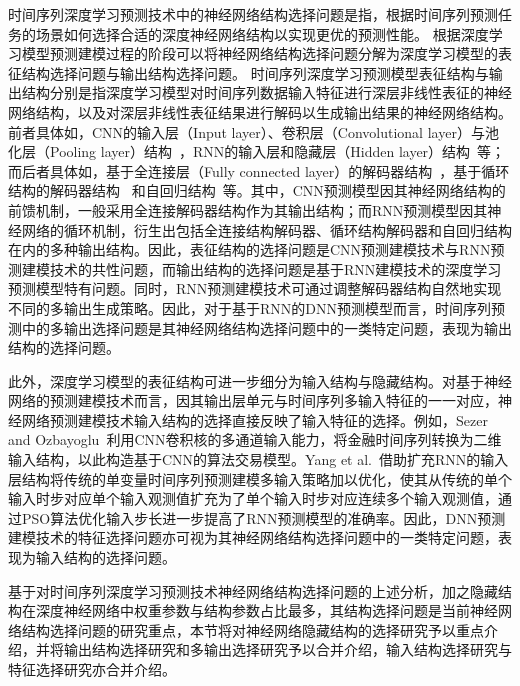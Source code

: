 时间序列深度学习预测技术中的神经网络结构选择问题是指，根据时间序列预测任务的场景如何选择合适的深度神经网络结构以实现更优的预测性能。
根据深度学习模型预测建模过程的阶段可以将神经网络结构选择问题分解为深度学习模型的表征结构选择问题与输出结构选择问题。
时间序列深度学习预测模型表征结构与输出结构分别是指深度学习模型对时间序列数据输入特征进行深层非线性表征的神经网络结构，以及对深层非线性表征结果进行解码以生成输出结果的神经网络结构。
前者具体如，CNN的输入层（Input layer）、卷积层（Convolutional layer）与池化层（Pooling layer）结构~\cite{koprinskaConvolutional2018}，RNN的输入层和隐藏层（Hidden layer）结构~\cite{salinasDeepAR2020}等；而后者具体如，基于全连接层（Fully connected layer）的解码器结构~\cite{koprinskaConvolutional2018,caiDayahead2019}，基于循环结构的解码器结构~\cite{liuDSTPRNN2020}
和自回归结构~\cite{caiDayahead2019,salinasDeepAR2020}等。其中，CNN预测模型因其神经网络结构的前馈机制，一般采用全连接解码器结构作为其输出结构；而RNN预测模型因其神经网络的循环机制，衍生出包括全连接结构解码器、循环结构解码器和自回归结构在内的多种输出结构。因此，表征结构的选择问题是CNN预测建模技术与RNN预测建模技术的共性问题，而输出结构的选择问题是基于RNN建模技术的深度学习预测模型特有问题。同时，RNN预测建模技术可通过调整解码器结构自然地实现不同的多输出生成策略。因此，对于基于RNN的DNN预测模型而言，时间序列预测中的多输出选择问题是其神经网络结构选择问题中的一类特定问题，表现为输出结构的选择问题。

此外，深度学习模型的表征结构可进一步细分为输入结构与隐藏结构。对基于神经网络的预测建模技术而言，因其输出层单元与时间序列多输入特征的一一对应，神经网络预测建模技术输入结构的选择直接反映了输入特征的选择。例如，Sezer and Ozbayoglu~\cite{sezer2018algorithmic}利用CNN卷积核的多通道输入能力，将金融时间序列转换为二维输入结构，以此构造基于CNN的算法交易模型。Yang et al.~\cite{yangShortterm2021}借助扩充RNN的输入层结构将传统的单变量时间序列预测建模多输入策略加以优化，使其从传统的单个输入时步对应单个输入观测值扩充为了单个输入时步对应连续多个输入观测值，通过PSO算法优化输入步长进一步提高了RNN预测模型的准确率。因此，DNN预测建模技术的特征选择问题亦可视为其神经网络结构选择问题中的一类特定问题，表现为输入结构的选择问题。

基于对时间序列深度学习预测技术神经网络结构选择问题的上述分析，加之隐藏结构在深度神经网络中权重参数与结构参数占比最多，其结构选择问题是当前神经网络结构选择问题的研究重点，本节将对神经网络隐藏结构的选择研究予以重点介绍，并将输出结构选择研究和多输出选择研究予以合并介绍，输入结构选择研究与特征选择研究亦合并介绍。

